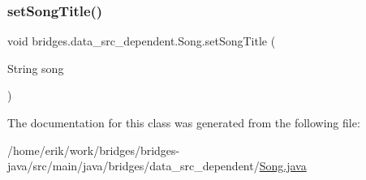 \mbox{\label{classbridges_1_1data__src__dependent_1_1_song_a9d7540c0e6cca53ae3a105885aac5622}} 
\subsubsection{\texorpdfstring{set\+Song\+Title()}{setSongTitle()}}
{\footnotesize\ttfamily void bridges.\+data\+\_\+src\+\_\+dependent.\+Song.\+set\+Song\+Title (\begin{DoxyParamCaption}\item[{String}]{song }\end{DoxyParamCaption})}



The documentation for this class was generated from the following file\+:\begin{DoxyCompactItemize}
\item 
/home/erik/work/bridges/bridges-\/java/src/main/java/bridges/data\+\_\+src\+\_\+dependent/\hyperlink{_song_8java}{Song.\+java}\end{DoxyCompactItemize}
